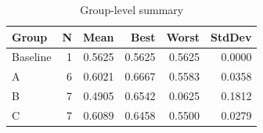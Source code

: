 \begin{table}[htbp]
\centering
\caption{Group-level summary}
\label{tab:group-summary}
\begin{tabular}{lrrrrr}
\toprule
\textbf{Group} & \textbf{N} & \textbf{Mean} & \textbf{Best} & \textbf{Worst} & \textbf{StdDev} \\
\midrule
Baseline & 1 & 0.5625 & 0.5625 & 0.5625 & 0.0000 \\
A & 6 & 0.6021 & 0.6667 & 0.5583 & 0.0358 \\
B & 7 & 0.4905 & 0.6542 & 0.0625 & 0.1812 \\
C & 7 & 0.6089 & 0.6458 & 0.5500 & 0.0279 \\
\bottomrule
\end{tabular}
\end{table}
